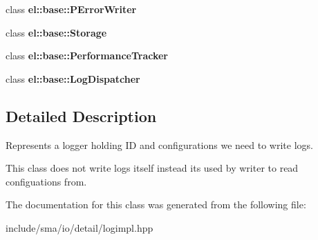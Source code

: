 \begin{DoxyCompactItemize}
\item 
\hypertarget{classel_1_1Logger_a2a368b9be1b8d6a29d4bb92a11807f39}{class {\bfseries el\-::base\-::\-P\-Error\-Writer}}\label{classel_1_1Logger_a2a368b9be1b8d6a29d4bb92a11807f39}

\item 
\hypertarget{classel_1_1Logger_acc1efd1b8a3fc5e0028dab98b02e550a}{class {\bfseries el\-::base\-::\-Storage}}\label{classel_1_1Logger_acc1efd1b8a3fc5e0028dab98b02e550a}

\item 
\hypertarget{classel_1_1Logger_a6a4d7851e1984800be3c230f06a79528}{class {\bfseries el\-::base\-::\-Performance\-Tracker}}\label{classel_1_1Logger_a6a4d7851e1984800be3c230f06a79528}

\item 
\hypertarget{classel_1_1Logger_a9b37b28ea1c5f8f862cc89f135711d92}{class {\bfseries el\-::base\-::\-Log\-Dispatcher}}\label{classel_1_1Logger_a9b37b28ea1c5f8f862cc89f135711d92}

\end{DoxyCompactItemize}


\subsection{Detailed Description}
Represents a logger holding I\-D and configurations we need to write logs. 

This class does not write logs itself instead its used by writer to read configuations from. 

The documentation for this class was generated from the following file\-:\begin{DoxyCompactItemize}
\item 
include/sma/io/detail/logimpl.\-hpp\end{DoxyCompactItemize}
